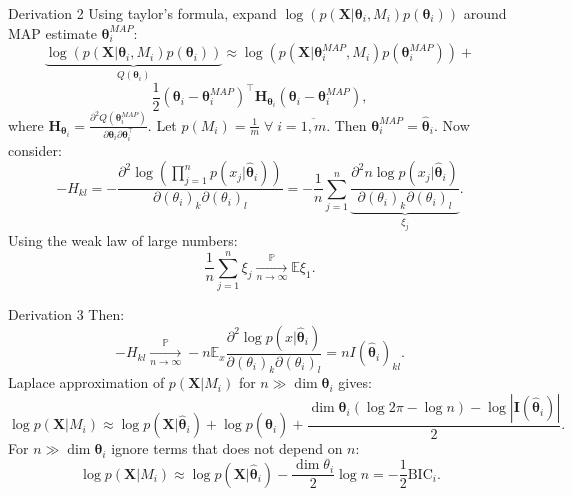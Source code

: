 \documentclass{beamer}
\begin{document}
\begin{frame}{Derivation 2}
    Using taylor's formula, expand $\log(p(\mathbf{X}|\boldsymbol\theta_i, M_i)p(\boldsymbol\theta_i))$
    around MAP estimate $\boldsymbol\theta_i^{MAP}$:
    \[
        \underbrace{\log(p(\mathbf{X}|\boldsymbol\theta_i, M_i)p(\boldsymbol\theta_i))}_{Q(\boldsymbol\theta_i)}
        \approx \log(p(\mathbf{X}|\boldsymbol\theta_i^{MAP}, M_i)p(\boldsymbol\theta_i^{MAP})) +
    \]
    \[
        \frac{1}{2}(\boldsymbol\theta_i - \boldsymbol\theta_i^{MAP})^\top \mathbf{H}_{\boldsymbol\theta_i}
        (\boldsymbol\theta_i - \boldsymbol\theta_i^{MAP}),
    \]
    where $\mathbf{H}_{\boldsymbol\theta_i} = \frac{\partial^2 Q(\boldsymbol\theta_i^{MAP})}
    {\partial \boldsymbol\theta_i\partial \boldsymbol\theta_i^\top}$. Let $p(M_i) = \frac{1}{m} \; 
    \forall \; i = \overline{1, m}$. Then $\boldsymbol\theta_i^{MAP} = \hat{\boldsymbol\theta}_i$. Now
    consider:
    \[
        -H_{kl} = -\frac{\partial^2\log(\prod_{j=1}^np(x_j|\hat{\boldsymbol\theta}_i))}
        {\partial (\theta_i)_k \partial (\theta_i)_l} = -\frac{1}{n}\sum_{j=1}^n
        \underbrace{\frac{\partial^2n\log p(x_j|\hat{\boldsymbol\theta}_i)}
        {\partial (\theta_i)_k \partial (\theta_i)_l}}_{\xi_j}.
    \]
    Using the weak law of large numbers:
    \[
        \frac{1}{n}\sum_{j=1}^n\xi_j \xrightarrow[n \to \infty]{\mathbb{P}} \mathbb{E}\xi_1.
    \]
\end{frame}



\begin{frame}{Derivation 3}
    Then:
    \[
        -H_{kl} \xrightarrow[n\to \infty]{\mathbb{P}} -n\mathbb{E}_x \frac{\partial ^2\log p(x|\hat{\boldsymbol\theta}_i)}
        {\partial(\theta_i)_k\partial(\theta_i)_l} = n I(\hat{\boldsymbol\theta}_i)_{kl}.
    \]
    Laplace approximation of $p(\mathbf{X}|M_i)$ for $n \gg \dim\boldsymbol\theta_i$ gives:
    \[
        \log p(\mathbf{X}|M_i) \approx \log p(\mathbf{X}|\hat{\boldsymbol\theta}_i) +
        \log p(\hat{\boldsymbol\theta}_i) + \frac{\dim{\boldsymbol\theta}_i(\log 2\pi - \log n)
        - \log |\mathbf{I}(\hat{\boldsymbol\theta}_i)|}{2}.
    \]
    For $n \gg \dim\boldsymbol\theta_i$ ignore terms that does not depend on $n$:
    \[
        \log p(\mathbf{X}|M_i) \approx \log p(\mathbf{X}|\hat{\boldsymbol\theta}_i) -
        \frac{\dim\theta_i}{2}\log n = -\frac{1}{2}\mathrm{BIC}_i.
    \]
\end{frame}
\end{document}
